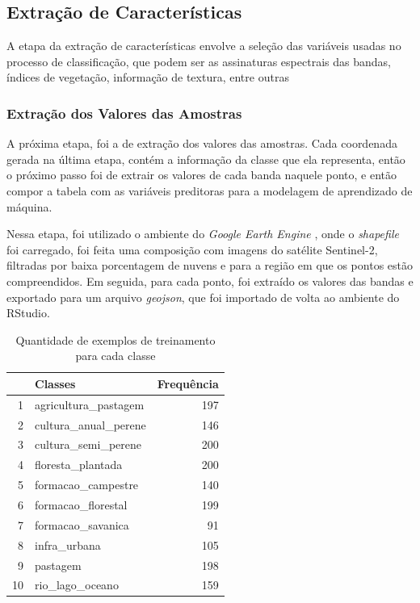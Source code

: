 \subsection{Extração de
Características}\label{extracao-de-caracteristicas}

	A etapa da extração de características envolve a seleção das variáveis
usadas no processo de classificação, que podem ser as assinaturas
espectrais das bandas, índices de vegetação, informação de textura,
entre outras \cite{lu-weng}

\subsubsection{Extração dos Valores das
Amostras}\label{extracao-dos-valores-das-amostras}

    A próxima etapa, foi a de extração dos valores das amostras. Cada
coordenada gerada na última etapa, contém a informação da classe que ela representa, então o próximo passo foi de extrair os valores de cada
banda naquele ponto, e então compor a tabela com as variáveis preditoras
para a modelagem de aprendizado de máquina.

    Nessa etapa, foi utilizado o ambiente do \textit{Google Earth Engine} \cite{gorelick2017google} , onde o \emph{shapefile} foi carregado, foi feita uma composição com imagens do satélite Sentinel-2, filtradas por baixa porcentagem de nuvens e para a região em que os pontos estão compreendidos. Em seguida, para cada ponto, foi extraído os valores das bandas e exportado para um arquivo \emph{geojson}, que foi importado de volta ao ambiente do RStudio.
    
\begin{table}[H]
    \caption{Quantidade de exemplos de treinamento para cada classe}
  	\centering
  	\begin{tabular}{rlr}
    	\hline
   		& Classes & Frequência \\ 
    	\hline
  	1 & agricultura\_pastagem & 197 \\ 
    2 & cultura\_anual\_perene & 146 \\ 
    3 & cultura\_semi\_perene & 200 \\ 
    4 & floresta\_plantada & 200 \\ 
    5 & formacao\_campestre & 140 \\ 
    6 & formacao\_florestal & 199 \\ 
    7 & formacao\_savanica &  91 \\ 
    8 & infra\_urbana & 105 \\ 
    9 & pastagem & 198 \\ 
    10 & rio\_lago\_oceano & 159 \\ 
    	\hline
	\end{tabular}
\end{table}


